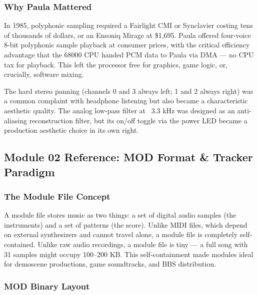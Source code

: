\documentclass[11pt,letterpaper]{article}
\begin{document}
\subsubsection{Why Paula Mattered}

In 1985, polyphonic sampling required a Fairlight CMI or Synclavier costing tens of thousands of dollars, or an Ensoniq Mirage at \$1,695. Paula offered four-voice 8-bit polyphonic sample playback at consumer prices, with the critical efficiency advantage that the 68000 CPU handed PCM data to Paula via DMA --- no CPU tax for playback. This left the processor free for graphics, game logic, or, crucially, software mixing.

The hard stereo panning (channels 0 and 3 always left; 1 and 2 always right) was a common complaint with headphone listening but also became a characteristic aesthetic quality. The analog low-pass filter at ~3.3 kHz was designed as an anti-aliasing reconstruction filter, but its on/off toggle via the power LED became a production aesthetic choice in its own right.

\subsection{Module 02 Reference: MOD Format \& Tracker Paradigm}

\subsubsection{The Module File Concept}

A module file stores music as two things: a set of digital audio samples (the instruments) and a set of patterns (the score). Unlike MIDI files, which depend on external synthesizers and cannot travel alone, a module file is completely self-contained. Unlike raw audio recordings, a module file is tiny --- a full song with 31 samples might occupy 100--200 KB. This self-containment made modules ideal for demoscene productions, game soundtracks, and BBS distribution.

\subsubsection{MOD Binary Layout}
\end{document}
